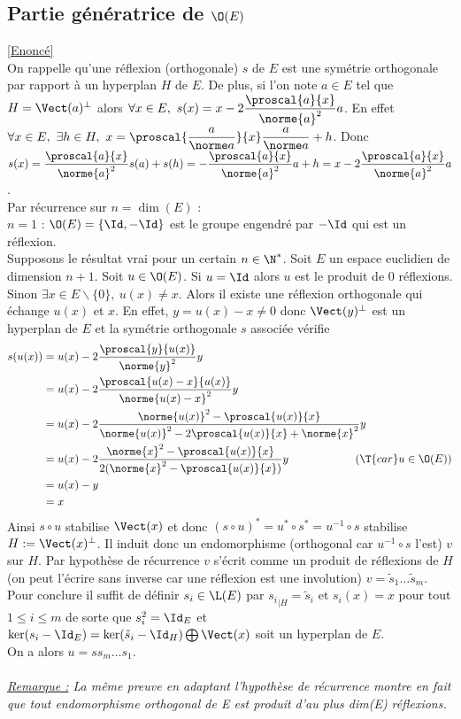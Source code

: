 \documentclass[8pt]{book}
\begin{document}
	\subsection{Partie génératrice de $\O(E)$ }
	\label{Partie génératrice de O(E) corrigé}
	\textcolor{blue}{\hyperref[Partie génératrice de O(E)]{[Enoncé]}}\\
	On rappelle qu'une réflexion (orthogonale) $s$ de $E$ est une symétrie orthogonale par rapport à un hyperplan $H$ de $E$. De plus, si l'on note $a\in E$ tel que $H=\Vect(a)^\bot$ alors $\forall x\in E,\ s(x)=x-2\dfrac{\proscal{a}{x}}{\norme{a}^2}a$. En effet $\forall x\in E,\ \exists h\in H,\ x=\displaystyle\proscal{\frac{a}{\norme a}}{x}\frac{a}{\norme a}+h$. Donc $s(x)=\displaystyle\frac{\proscal{a}{x}}{\norme{a}^2}s(a)+s(h)=-\frac{\proscal{a}{x}}{\norme{a}^2}a+h=x-2\frac{\proscal{a}{x}}{\norme{a}^2}a$.\\
	Par récurrence sur $n=\dim(E)$ :\\
	$n=1$ : $\O(E)=\{\Id,-\Id\}$ est le groupe engendré par $-\Id$ qui est un réflexion.\\
	Supposons le résultat vrai pour un certain $n\in \N^*$. Soit $E$ un espace euclidien de dimension $n+1$. Soit $u\in \O(E)$. Si $u=\Id$ alors $u$ est le produit de $0$ réflexions. Sinon $\exists x\in E\backslash\{0\},\ u(x)\ne x$. Alors il existe une réflexion orthogonale qui échange $u(x)$ et $x$. En effet, $y=u(x)-x\ne 0$ donc $\Vect(y)^\bot$ est un hyperplan de $E$ et la symétrie orthogonale $s$ associée vérifie
	\begin{align*}
		s(u(x))&=u(x)-2\frac{\proscal{y}{u(x)}}{\norme{y}^2}y\\
		&=u(x)-2\frac{\proscal{u(x)-x}{u(x)}}{\norme{u(x)-x}^2}y\\
		&=u(x)-2\frac{\norme{u(x)}^2-\proscal{u(x)}{x}}{\norme{u(x)}^2-2\proscal{u(x)}{x}+\norme{x}^2}y\\
		&=u(x)-2\frac{\norme{x}^2-\proscal{u(x)}{x}}{2(\norme{x}^2-\proscal{u(x)}{x})}y\quad\quad\quad\quad\quad\quad (\T{car }u\in \O(E))\\
		&=u(x)-y\\
		&=x
	\end{align*}
	Ainsi $s\circ u$ stabilise $\Vect(x)$ et donc $(s\circ u)^*=u^*\circ s^*=u^{-1}\circ s$ stabilise $H:=\Vect(x)^\bot$. Il induit donc un endomorphisme (orthogonal car $u^{-1}\circ s$ l'est) $v$ sur $H$. Par hypothèse de récurrence $v$ s'écrit comme un produit de réflexions de $H$ (on peut l'écrire sans inverse car une réflexion est une involution) $v=\tilde s_1\dots\tilde s_m$.\\
	Pour conclure il suffit de définir $s_i\in \L(E)$ par ${s_i}_{|H}=\tilde s_i$ et $s_i(x)=x$ pour tout $1\leq i\leq m$ de sorte que $s_i^2=\Id_E$ et $\ker(s_i-\Id_E)=\ker(\tilde s_i-\Id_H)\bigoplus\Vect(x)$ soit un hyperplan de $E$.\\
	On a alors $u=ss_m\dots s_1$.\\\\
	\textit{\underline{Remarque :} La même preuve en adaptant l'hypothèse de récurrence montre en fait que tout endomorphisme orthogonal de E est produit d'au plus dim(E) réflexions.}
	
\end{document}
